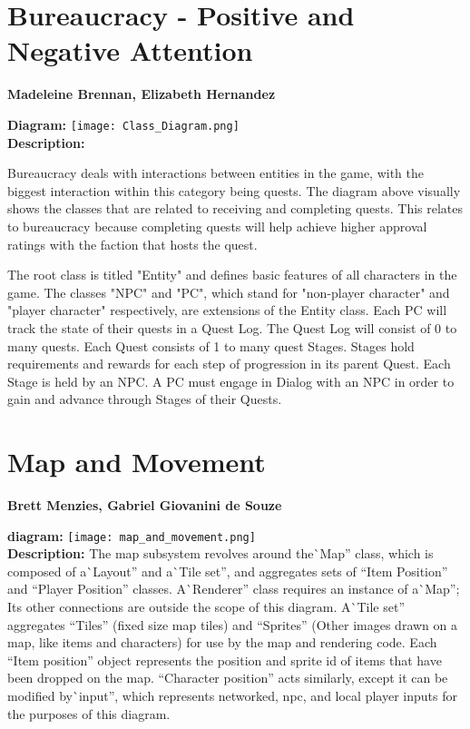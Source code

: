 \documentclass[12pt]{report}
\begin{document}
\chapter{Bureaucracy - Positive and Negative Attention}
\textbf{Madeleine Brennan, Elizabeth Hernandez}

\textbf{Diagram:}
\texttt{[image: Class\_Diagram.png]}\\

\textbf{Description:}

Bureaucracy deals with interactions between entities in the game, with the biggest interaction within this category being quests. The diagram above visually shows the classes that are related to receiving and completing quests. This relates to bureaucracy because completing quests will help achieve higher approval ratings with the faction that hosts the quest.

The root class is titled "Entity" and defines basic features of all characters in the game.
The classes "NPC" and "PC", which stand for "non-player character" and "player character" respectively, are extensions of the Entity class. 
Each PC will track the state of their quests in a Quest Log. 
The Quest Log will consist of 0 to many quests.
Each Quest consists of 1 to many quest Stages.
Stages hold requirements and rewards for each step of progression in its parent Quest.
Each Stage is held by an NPC.
A PC must engage in Dialog with an NPC in order to gain and advance through Stages of their Quests.

\chapter{Map and Movement}
\textbf{Brett Menzies, Gabriel Giovanini de Souze}

\textbf{diagram:}
\texttt{[image: map\_and\_movement.png]}\\
\textbf{Description:}
The map subsystem revolves around the\`{ }Map'' class,
which is composed of a\`{ }Layout'' and a\`{ }Tile set'',
 and aggregates sets of ``Item Position'' and ``Player Position'' classes.
 A\`{ }Renderer'' class requires an instance of a\`{ }Map'';
  Its other connections are outside the scope of this diagram.
  A\`{ }Tile set'' aggregates ``Tiles'' (fixed size map tiles) and 
   ``Sprites'' (Other images drawn on a map, like items and characters) for use by the map and rendering code.
    Each ``Item position'' object represents the position and sprite id of items that have been dropped on the map.
    ``Character position'' acts similarly, except it can be modified by\`{ }input'', which represents 
     networked, npc, and local player inputs for the purposes of this diagram.
\end{document}
